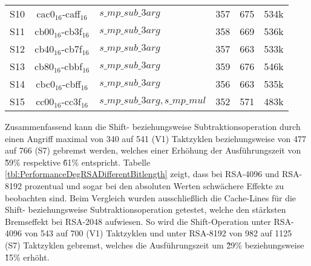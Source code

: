 \begin{table}[h]
\begin{tabular}{cclccc}
S10 & cac0$_{16}$-caff$_{16}$  & $s\_mp\_sub\_3arg$             & 357   & 675         & 534k    \\
S11 & cb00$_{16}$-cb3f$_{16}$  & $s\_mp\_sub\_3arg$            & 358   & 669         & 536k    \\
S12 & cb40$_{16}$-cb7f$_{16}$  & $s\_mp\_sub\_3arg$             & 357   & 663         & 533k    \\
S13 & cb80$_{16}$-cbbf$_{16}$  & $s\_mp\_sub\_3arg$             & 359   & 676         & 546k    \\
S14 & cbc0$_{16}$-cbff$_{16}$  & $s\_mp\_sub\_3arg$             & 356   & 663         & 535k    \\
S15 & cc00$_{16}$-cc3f$_{16}$  & $s\_mp\_sub\_3arg, s\_mp\_mul$ & 352   & 571         & 483k   
\end{tabular}
\end{table}


Zusammenfassend kann die Shift- beziehungsweise Subtraktionsoperation durch einen Angriff maximal von 340 auf 541 (V1) Taktzyklen beziehungsweise von 477 auf 766 (S7) gebremst werden, welches einer Erhöhung der Ausführungszeit von \~59\% respektive \~61\% entspricht.
Tabelle \ref{tbl:PerformanceDegRSADifferentBitlength} zeigt, dass bei RSA-4096 und RSA-8192 prozentual und sogar bei den absoluten Werten schwächere Effekte zu beobachten sind.
Beim Vergleich wurden ausschließlich die Cache-Lines für die Shift- beziehungsweise Subtraktionsoperation getestet, welche den stärksten Bremseffekt bei RSA-2048 aufwiesen.
So wird die Shift-Operation unter RSA-4096 von 543 auf 700 (V1) Taktzyklen und unter RSA-8192 von 982 auf 1125 (S7) Taktzyklen gebremst, welches die Ausführungszeit um \~29\% beziehungsweise \~15\% erhöht.


